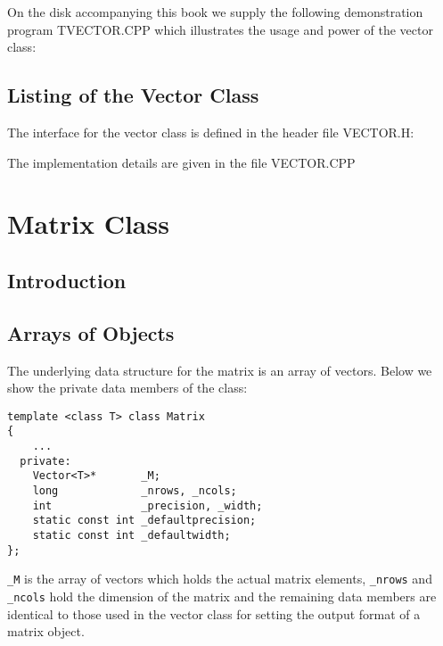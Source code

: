 On the disk accompanying this book we supply the following demonstration 
program TVECTOR.CPP which illustrates the usage and power of the vector 
class:
\noindent
{\footnotesize  }


\subsection{Listing of the Vector Class \label{vec_listing}}

The interface for the vector class is defined in the header file
VECTOR.H:
{\footnotesize  }

The implementation details are given in the file VECTOR.CPP
{\footnotesize  }


\section{Matrix Class}

\subsection{Introduction}


\subsection{Arrays of Objects}

The underlying data structure for the matrix is an array of vectors.
Below we show the private data members of the class:
{\footnotesize \begin{verbatim}
template <class T> class Matrix
{
    ...
  private:
    Vector<T>*       _M;
    long             _nrows, _ncols;
    int              _precision, _width;
    static const int _defaultprecision;
    static const int _defaultwidth;
};
\end{verbatim}}
\verb+_M+ is the array of vectors which holds the actual matrix elements,
\verb+_nrows+ and \verb+_ncols+ hold the dimension of the matrix and
the remaining data members are identical to those used in the vector
class for setting the output format of a matrix object.

